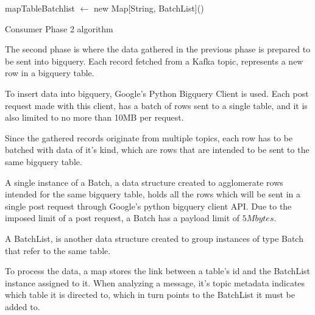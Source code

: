\IncMargin{1em} \begin{algorithm}[h]
       \BlankLine

mapTableBatchlist $\leftarrow$ new Map[String, BatchList]()\; 
 \caption{Consumer Phase 2 algorithm}
\label{algo:phase_2} \end{algorithm}\DecMargin{1em}

The second phase is where the data gathered in the previous phase is prepared to
be sent into bigquery. Each record fetched from a Kafka topic, represents a new
row in a bigquery table. 

To insert data into bigquery, Google's Python Bigquery Client is used. Each post
request made with this client, has a batch of rows sent to a single table, and
it is also limited to no more than 10MB per request.

Since the gathered records originate from multiple topics, each row has to be
batched with data of it's kind, which are rows that are intended to be sent to
the same bigquery table.

A single instance of a Batch, a data structure created to agglomerate rows
intended for the same bigquery table, holds all the rows which will be sent in a
single post request through Google's python bigquery client API. Due to the
imposed limit of a post request, a Batch has a payload limit of $5 Mbytes$. 

A BatchList, is another data structure created to group instances of type Batch
that refer to the same table.

To process the data, a map stores the link between a table's id and the
BatchList instance assigned to it. When analyzing a message, it's topic metadata
indicates which table it is directed to, which in turn points to the BatchList
it must be added to.

